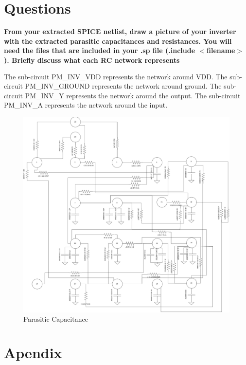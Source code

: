 \documentclass[11pt]{article}
\begin{document}
\section*{Questions}
	\textbf{From your extracted SPICE netlist, draw a picture of your inverter with the extracted parasitic capacitances and resistances.  You will need the files that are included in your .sp file (.include $<$filename$>$).  Briefly discuss what each RC network represents}
	
	The sub-circuit PM\_INV\_VDD represents the network around VDD. The sub-circuit PM\_INV\_GROUND represents the network around ground. The sub-circuit PM\_INV\_Y represents the network around the output. The sub-circuit PM\_INV\_A represents the network around the input. 
	
	\begin{figure}[H]
		\centering
		\includegraphics[width=1\linewidth]{"Pictures/Parasidic Caps"}
		\caption{Parasitic Capacitance}
		\label{fig:parasidic-caps}
	\end{figure}


\section{Apendix}
\end{document}

